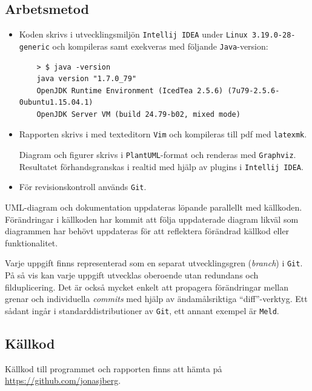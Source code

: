 \subsection*{Arbetsmetod}
\begin{itemize}
    \item Koden skrivs i utvecklingsmiljön \texttt{Intellij IDEA} under
    \texttt{Linux 3.19.0-28-generic} och kompileras samt exekveras med följande
    \texttt{Java}-version:
    \begin{verbatim}
    > $ java -version
    java version "1.7.0_79"
    OpenJDK Runtime Environment (IcedTea 2.5.6) (7u79-2.5.6-0ubuntu1.15.04.1)
    OpenJDK Server VM (build 24.79-b02, mixed mode)
    \end{verbatim}

    \item Rapporten skrivs i \latex med texteditorn \texttt{Vim} och kompileras
    till pdf med \texttt{latexmk}.
    \par Diagram och figurer skrivs i \texttt{PlantUML}-format och renderas med
    \texttt{Graphviz}. Resultatet förhandsgranskas i realtid med hjälp av
    plugins i \texttt{Intellij IDEA}.

    \item För revisionskontroll används \texttt{Git}. 
\end{itemize}

UML-diagram och dokumentation uppdateras löpande parallellt med källkoden.
Förändringar i källkoden har kommit att följa uppdaterade diagram likväl som
diagrammen har behövt uppdateras för att reflektera förändrad källkod eller
funktionalitet.
\par Varje uppgift finns representerad som en separat utvecklingsgren
(\emph{branch}) i \texttt{Git}. På så vis kan varje uppgift utvecklas oberoende
utan redundans och filduplicering. Det är också mycket enkelt att propagera
förändringar mellan grenar och individuella \emph{commits} med hjälp av
ändamålsriktiga ``diff''-verktyg. Ett sådant ingår i standarddistributioner av 
\texttt{Git}, ett annant exempel är \texttt{Meld}.


\subsection*{Källkod}
\par Källkod till programmet och rapporten finns att hämta på \url{https://github.com/jonasjberg}.
